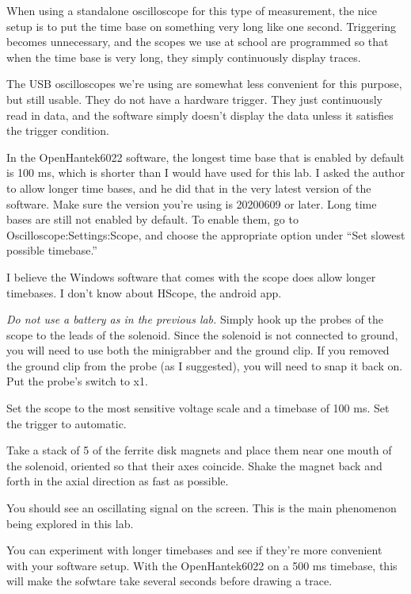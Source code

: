 When using a standalone oscilloscope for this type of measurement, the
nice setup is to put the time base on something very long like one
second.  Triggering becomes unnecessary, and the scopes we use at
school are programmed so that when the time base is very long, they
simply continuously display traces.

The USB oscilloscopes we're using are somewhat less convenient for
this purpose, but still usable. They do not have a hardware trigger.
They just continuously read in data, and the software simply doesn't
display the data unless it satisfies the trigger condition.

In the OpenHantek6022
software, the longest time base that is enabled by default is 100 ms, which is
shorter than I would have used for this lab. I asked the author to allow
longer time bases, and he did that in the very latest version of the software.
Make sure the version you're using is 20200609 or later.
Long time bases are still not enabled by default. To enable them, go to Oscilloscope:Settings:Scope,
and choose the appropriate option under ``Set slowest possible timebase.''

I believe the Windows software that comes with the scope does allow longer
timebases. I don't know about HScope, the android app.


\emph{Do not use a battery as in the previous lab.} Simply hook up
the probes of the scope to the leads of the solenoid. Since the solenoid
is not connected to ground, you will need to use both the minigrabber and
the ground clip. If you removed the ground clip from the probe (as I suggested),
you will need to snap it back on. Put the probe's switch to x1.

Set the scope to the most sensitive voltage scale and a timebase of 100 ms.
Set the trigger to automatic.

Take a stack of 5 of the ferrite disk magnets and place them near one
mouth of the solenoid, oriented so that their axes coincide. Shake the
magnet back and forth in the axial direction as fast as possible.

You should see an oscillating signal on the screen. This is the main phenomenon
being explored in this lab.

You can experiment with longer timebases and see if they're more convenient with
your software setup. With the OpenHantek6022 on a 500 ms timebase, this will make the sofwtare take
several seconds before drawing a trace.

